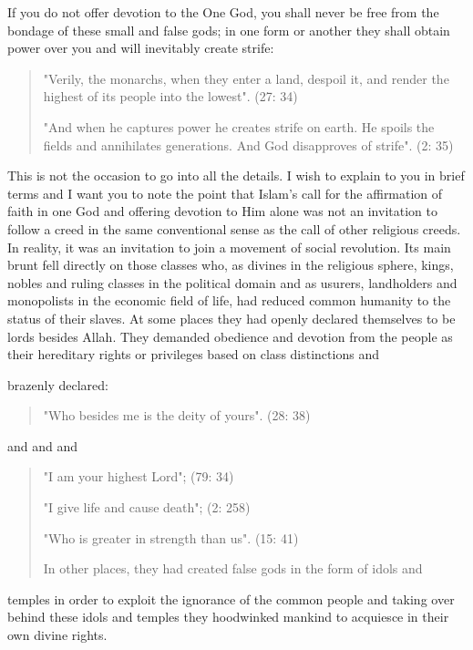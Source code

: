 If you do not offer devotion to the One God, you shall never be free
from the bondage of these small and false gods; in one form or another
they shall obtain power over you and will inevitably create strife:

\begin{quote}
"Verily, the monarchs, when they enter a land, despoil it, and render
the highest of its people into the lowest". (27: 34)

"And when he captures power he creates strife on earth. He spoils the
fields and annihilates generations. And God disapproves of strife". (2:
35)
\end{quote}

This is not the occasion to go into all the details. I wish to explain
to you in brief terms and I want you to note the point that Islam's call
for the affirmation of faith in one God and offering devotion to Him
alone was not an invitation to follow a creed in the same conventional
sense as the call of other religious creeds. In reality, it was an
invitation to join a movement of social revolution. Its main brunt fell
directly on those classes who, as divines in the religious sphere,
kings, nobles and ruling classes in the political domain and as usurers,
landholders and monopolists in the economic field of life, had reduced
common humanity to the status of their slaves. At some places they had
openly declared themselves to be lords besides Allah. They demanded
obedience and devotion from the people as their hereditary rights or
privileges based on class distinctions and

brazenly declared:

\begin{quote}
"Who besides me is the deity of yours". (28: 38)
\end{quote}

and and and

\begin{quote}
"I am your highest Lord"; (79: 34)

"I give life and cause death"; (2: 258)

"Who is greater in strength than us". (15: 41)

In other places, they had created false gods in the form of idols and
\end{quote}

temples in order to exploit the ignorance of the common people and
taking over behind these idols and temples they hoodwinked mankind to
acquiesce in their own divine rights.

